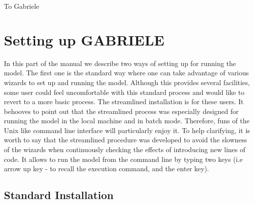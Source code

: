 \documentclass{book}
\begin{document}
\newpage
\thispagestyle{empty}

\null

\newpage
\thispagestyle{empty}

\vspace*{5cm}
\begin{flushright}
	To Gabriele
\end{flushright}

\newpage
\thispagestyle{empty}

\null

\newpage


\tableofcontents
 





\printglossaries

\clearpage
\thispagestyle{empty}

\part{Setting up GABRIELE}


In this part of the manual we describe two ways of setting up for running the model. The first one is the standard way where one can take advantage of various wizards to set up and running the model. Although this provides several facilities, some user could feel uncomfortable with this standard process and would like to revert to a more basic process. The streamlined installation is for these users. It behooves to point out that the streamlined process was especially designed for running the model in the local machine and in batch mode. Therefore, funs of the Unix like command line interface will particularly enjoy it. To help clarifying, it is worth to say that the streamlined procedure was developed to avoid the slowness of the wizards when continuously checking the effects of introducing new lines of code. It allows to run the model from the command line by typing two keys (i.e arrow up key - to recall the execution command, and the enter key). 

\chapter{Standard Installation}
\end{document}
